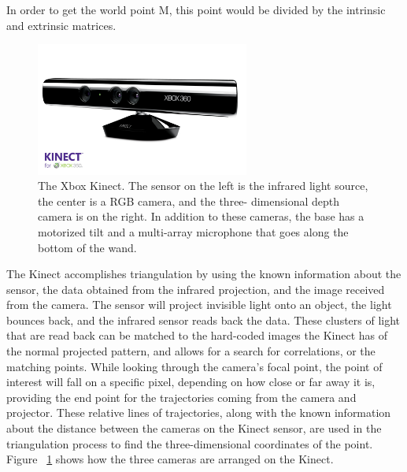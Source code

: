 \documentclass[pdftex,10.5pt]{report}
\begin{document}
\noindent In order to get the world point M, this point would be divided by the intrinsic and extrinsic matrices.

\begin{figure}[H]
	\centering
	\includegraphics[width=70mm]{figures/kinect.jpg}
	\caption{The Xbox Kinect. The sensor on the left is the infrared light source, the center is a RGB camera, and the three-	dimensional depth camera is on the right. In addition to these cameras, the base has a motorized tilt and a multi-array microphone that goes along the bottom of the wand.}
	\label{kinectlable}
\end{figure}

The Kinect accomplishes triangulation by using the known information about the sensor, the data obtained from the infrared projection, and the image received from the camera. The sensor will project invisible light onto an object, the light bounces back, and the infrared sensor reads back the data. These clusters of light that are read back can be matched to the hard-coded images the Kinect has of the normal projected pattern, and allows for a search for correlations, or the matching points. While looking through the camera's focal point, the point of interest will fall on a specific pixel, depending on how close or far away it is, providing the end point for the trajectories coming from the camera and projector. These relative lines of trajectories, along with the known information about the distance between the cameras on the Kinect sensor, are used in the triangulation process to find the three-dimensional coordinates of the point. Figure ~\ref{kinectlable} shows how the three cameras are arranged on the Kinect.
\end{document}
